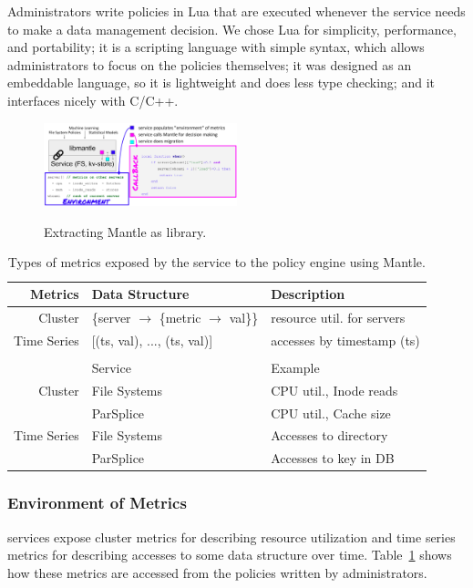 Administrators write policies in
Lua that are executed whenever the service needs to make a data management
decision. We chose Lua for simplicity, performance, and portability; it is a
scripting language with simple syntax, which allows administrators to focus on
the policies themselves; it was designed as an embeddable language, so it is
lightweight and does less type checking; and it interfaces nicely with C/C++.

\begin{figure}[t]
  \noindent\includegraphics[width=0.5\textwidth]{figures/mantle.png}\\

  \caption{Extracting Mantle as library.\label{fig:mantle}}

\end{figure}

\begin{table}
  \centering
  \begin{tabular}{ r | l | l }
  Metrics     & Data Structure & Description \\\hline
  Cluster     & \{server \(\rightarrow\) \{metric \(\rightarrow\) val\}\}
              & resource util. for servers \\
  Time Series & [(ts, val), ..., (ts, val)]
              & accesses by timestamp (ts) \\
  && \\
              & Service      & Example \\\hline
  Cluster     & File Systems & CPU util., Inode reads \\
              & ParSplice    & CPU util., Cache size \\
  Time Series & File Systems & Accesses to directory \\
              & ParSplice    & Accesses to key in DB\\
  \end{tabular}
  \caption{Types of metrics exposed by the service to the policy engine using Mantle.\label{table:metrics}}
\end{table}

\subsubsection{Environment of Metrics} services expose cluster metrics for
describing resource utilization and time series metrics for describing accesses
to some data structure over time. Table~\ref{table:metrics} shows how these
metrics are accessed from the policies written by administrators. 

